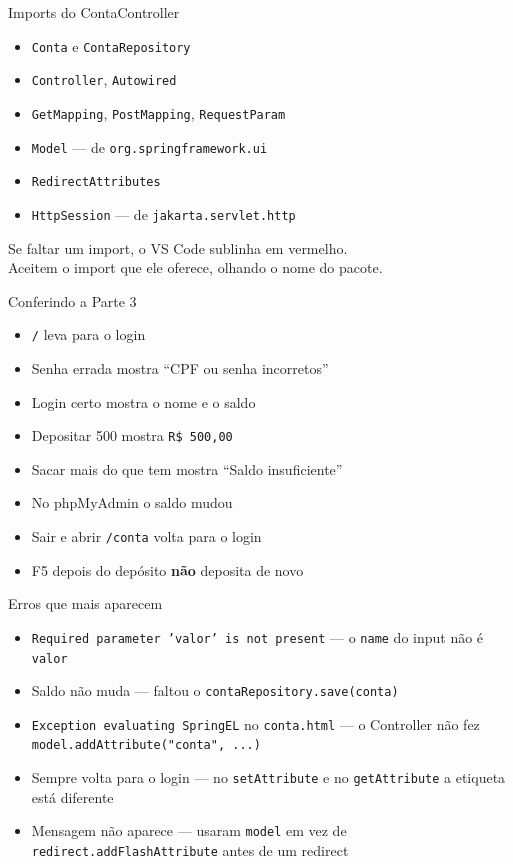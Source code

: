 \documentclass[aspectratio=169,11pt]{beamer}
\begin{document}
\begin{frame}{Imports do ContaController}
  \begin{itemize}
    \item \texttt{Conta} e \texttt{ContaRepository}
    \item \texttt{Controller}, \texttt{Autowired}
    \item \texttt{GetMapping}, \texttt{PostMapping}, \texttt{RequestParam}
    \item \texttt{Model} --- de \texttt{org.springframework.ui}
    \item \texttt{RedirectAttributes}
    \item \texttt{HttpSession} --- de \texttt{jakarta.servlet.http}
  \end{itemize}

  \vspace{0.5em}
  Se faltar um import, o VS Code sublinha em vermelho.\\
  Aceitem o import que ele oferece, olhando o nome do pacote.
\end{frame}

\begin{frame}{Conferindo a Parte 3}
  \begin{itemize}
    \item [ ] \texttt{/} leva para o login
    \item [ ] Senha errada mostra ``CPF ou senha incorretos''
    \item [ ] Login certo mostra o nome e o saldo
    \item [ ] Depositar 500 mostra \texttt{R\$ 500,00}
    \item [ ] Sacar mais do que tem mostra ``Saldo insuficiente''
    \item [ ] No phpMyAdmin o saldo mudou
    \item [ ] Sair e abrir \texttt{/conta} volta para o login
    \item [ ] F5 depois do depósito \textbf{não} deposita de novo
  \end{itemize}
\end{frame}

\begin{frame}{Erros que mais aparecem}
  \begin{itemize}
    \item \texttt{Required parameter 'valor' is not present} ---
          o \texttt{name} do input não é \texttt{valor}
    \item Saldo não muda --- faltou o \texttt{contaRepository.save(conta)}
    \item \texttt{Exception evaluating SpringEL} no \texttt{conta.html} ---
          o Controller não fez \texttt{model.addAttribute("conta", ...)}
    \item Sempre volta para o login --- no \texttt{setAttribute} e no
          \texttt{getAttribute} a etiqueta está diferente
    \item Mensagem não aparece --- usaram \texttt{model} em vez de
          \texttt{redirect.addFlashAttribute} antes de um redirect
  \end{itemize}
\end{frame}
\end{document}
